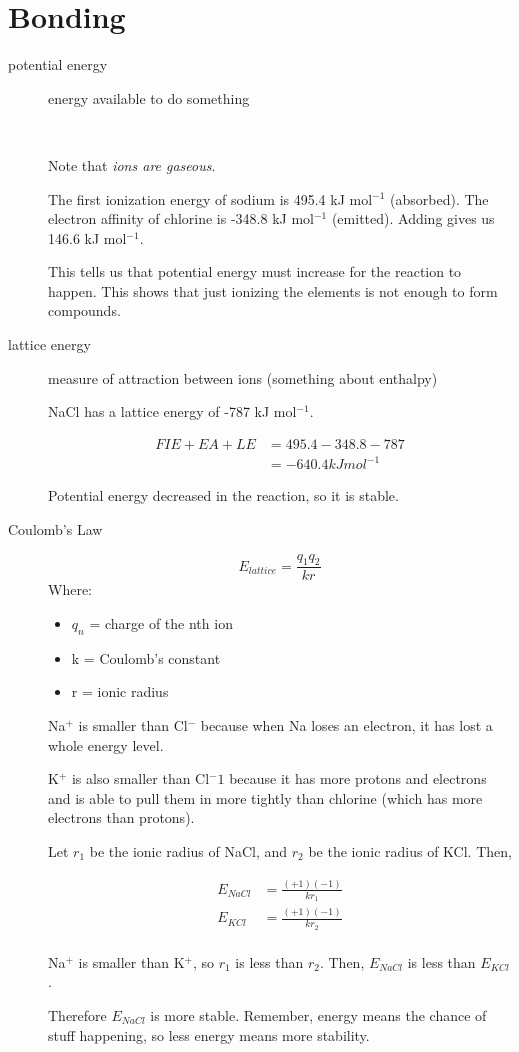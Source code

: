 \documentclass[a4paper, 8pt]{memoir}
\begin{document}
\chapter{Bonding}
\begin{description}
\item[potential energy] energy available to do something

 \\

Note that \emph{ions are gaseous}.

The first ionization energy of sodium is 495.4 kJ mol$^{-1}$ (absorbed). The electron affinity of chlorine is -348.8 kJ mol$^{-1}$ (emitted). Adding gives us 146.6 kJ mol$^{-1}$.

This tells us that potential energy must increase for the reaction to happen. This shows that just ionizing the elements is not enough to form compounds.

\item[lattice energy] measure of attraction between ions (something about enthalpy)

NaCl has a lattice energy of -787 kJ mol$^{-1}$.

\begin{align*}
FIE + EA + LE &= 495.4 - 348.8 - 787 \\
&= -640.4 kJ mol^{-1}
\end{align*}

Potential energy decreased in the reaction, so it is stable.

\item[Coulomb's Law] \begin{equation}
E_{lattice} = \frac{q_1 q_2}{k r}
\end{equation}
Where:
\begin{itemize}
\item $q_n$ = charge of the nth ion
\item k = Coulomb's constant
\item r = ionic radius
\end{itemize}

Na$^+$ is smaller than Cl$^-$ because when Na loses an electron, it has lost a whole energy level.

K$^+$ is also smaller than Cl$^-1$ because it has more protons and electrons and is able to pull them in more tightly than chlorine (which has more electrons than protons).

Let $r_1$ be the ionic radius of NaCl, and $r_2$ be the ionic radius of KCl. Then,

\begin{align*}
E_{NaCl} &= \frac{(+1)(-1)}{kr_1} \\
E_{KCl} &= \frac{(+1)(-1)}{kr_2} \\
\end{align*}

Na$^+$ is smaller than K$^+$, so $r_1$ is less than $r_2$. Then, $E_{NaCl}$ is less than $E_{KCl}$.

Therefore $E_{NaCl}$ is more stable. Remember, energy means the chance of stuff happening, so less energy means more stability.
\end{description}
\end{document}
